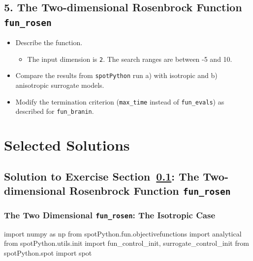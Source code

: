 \documentclass[
  letterpaper,
  DIV=11,
  numbers=noendperiod]{scrreprt}
\newenvironment{Shaded}{\begin{snugshade}}{\end{snugshade}}
\newcommand{\ImportTok}[1]{\textcolor[rgb]{0.00,0.46,0.62}{#1}}
\newcommand{\NormalTok}[1]{\textcolor[rgb]{0.00,0.23,0.31}{#1}}
\providecommand{\tightlist}{%
  \setlength{\itemsep}{0pt}\setlength{\parskip}{0pt}}\usepackage{longtable,booktabs,array}
\begin{document}
\subsection{\texorpdfstring{5. The Two-dimensional Rosenbrock Function
\texttt{fun\_rosen}}{5. The Two-dimensional Rosenbrock Function fun\_rosen}}\label{sec-09-exercise-rosen}

\begin{itemize}
\tightlist
\item
  Describe the function.

  \begin{itemize}
  \tightlist
  \item
    The input dimension is \texttt{2}. The search ranges are between -5
    and 10.
  \end{itemize}
\item
  Compare the results from \texttt{spotPython} run a) with isotropic and
  b) anisotropic surrogate models.
\item
  Modify the termination criterion (\texttt{max\_time} instead of
  \texttt{fun\_evals}) as described for \texttt{fun\_branin}.
\end{itemize}

\section{Selected Solutions}\label{selected-solutions-1}

\subsection{\texorpdfstring{Solution to Exercise
Section~\ref{sec-09-exercise-rosen}: The Two-dimensional Rosenbrock
Function
\texttt{fun\_rosen}}{Solution to Exercise Section~: The Two-dimensional Rosenbrock Function fun\_rosen}}\label{solution-to-exercise-sec-09-exercise-rosen-the-two-dimensional-rosenbrock-function-fun_rosen}

\subsubsection{\texorpdfstring{The Two Dimensional \texttt{fun\_rosen}:
The Isotropic
Case}{The Two Dimensional fun\_rosen: The Isotropic Case}}\label{the-two-dimensional-fun_rosen-the-isotropic-case}

\begin{Shaded}
\begin{Highlighting}[]
\ImportTok{import}\NormalTok{ numpy }\ImportTok{as}\NormalTok{ np}
\ImportTok{from}\NormalTok{ spotPython.fun.objectivefunctions }\ImportTok{import}\NormalTok{ analytical}
\ImportTok{from}\NormalTok{ spotPython.utils.init }\ImportTok{import}\NormalTok{ fun\_control\_init, surrogate\_control\_init}
\ImportTok{from}\NormalTok{ spotPython.spot }\ImportTok{import}\NormalTok{ spot}
\end{Highlighting}
\end{Shaded}
\end{document}
